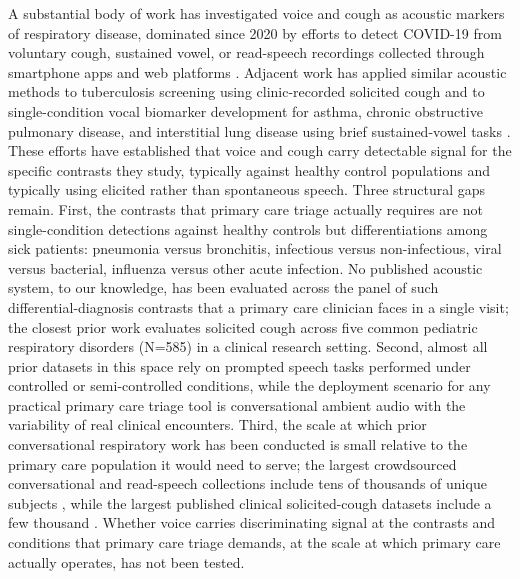 \documentclass[utf8]{FrontiersinHarvard} %
\begin{document}
A substantial body of work has investigated voice and cough as acoustic markers of respiratory disease, dominated since 2020 by efforts to detect COVID-19 from voluntary cough, sustained vowel, or read-speech recordings collected through smartphone apps and web platforms \citep{covid-19-sounds-xia-2021,dicova-1-2021}. Adjacent work has applied similar acoustic methods to tuberculosis screening using clinic-recorded solicited cough \citep{coda-tb-dream-2024,pahar-tb-cough-2021} and to single-condition vocal biomarker development for asthma, chronic obstructive pulmonary disease, and interstitial lung disease using brief sustained-vowel tasks \citep{sonde-rrvb-jmir-2023}. These efforts have established that voice and cough carry detectable signal for the specific contrasts they study, typically against healthy control populations and typically using elicited rather than spontaneous speech. Three structural gaps remain. First, the contrasts that primary care triage actually requires are not single-condition detections against healthy controls but differentiations among sick patients: pneumonia versus bronchitis, infectious versus non-infectious, viral versus bacterial, influenza versus other acute infection. No published acoustic system, to our knowledge, has been evaluated across the panel of such differential-diagnosis contrasts that a primary care clinician faces in a single visit; the closest prior work \citep{porter-pediatric-cough-multidisease-2019} evaluates solicited cough across five common pediatric respiratory disorders (N=585) in a clinical research setting. Second, almost all prior datasets in this space rely on prompted speech tasks performed under controlled or semi-controlled conditions, while the deployment scenario for any practical primary care triage tool is conversational ambient audio with the variability of real clinical encounters. Third, the scale at which prior conversational respiratory work has been conducted is small relative to the primary care population it would need to serve; the largest crowdsourced conversational and read-speech collections include tens of thousands of unique subjects \citep{covid-19-sounds-xia-2021,coswara-2020}, while the largest published clinical solicited-cough datasets include a few thousand \citep{coda-tb-dream-2024}. Whether voice carries discriminating signal at the contrasts and conditions that primary care triage demands, at the scale at which primary care actually operates, has not been tested.
\end{document}
